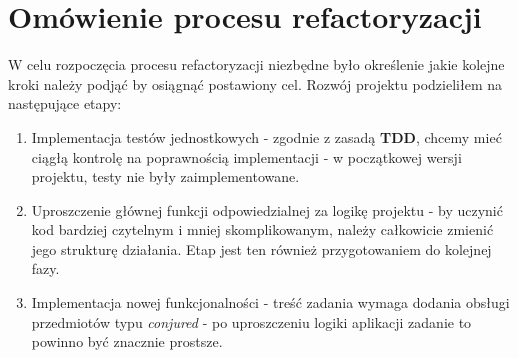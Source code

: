 \documentclass[a4paper, 11pt]{article}
\begin{document}
\section{Omówienie procesu refactoryzacji}
W celu rozpoczęcia procesu refactoryzacji niezbędne było określenie jakie kolejne kroki należy podjąć by osiągnąć postawiony cel. Rozwój projektu podzieliłem na następujące etapy:
\begin{enumerate}
 \item Implementacja testów jednostkowych - zgodnie z zasadą \textbf{TDD}, chcemy mieć ciągłą kontrolę na poprawnością implementacji - w początkowej wersji projektu, testy nie były zaimplementowane.
 \item Uproszczenie głównej funkcji odpowiedzialnej za logikę projektu - by uczynić kod bardziej czytelnym i mniej skomplikowanym, należy całkowicie zmienić jego strukturę działania. Etap jest ten również przygotowaniem do kolejnej fazy.
 \item Implementacja nowej funkcjonalności - treść zadania wymaga dodania obsługi przedmiotów typu \textit{conjured} - po uproszczeniu logiki aplikacji zadanie to powinno być znacznie prostsze.
\end{enumerate}
\end{document}
